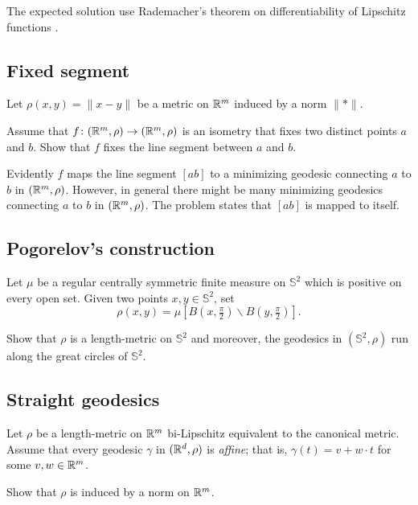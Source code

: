 The expected solution use Rademacher's theorem on differentiability of Lipschitz functions \cite[see][]{rademacher}. 



\subsection*{Fixed segment}
\label{Fixed segment}

\begin{pr}
Let $\rho(x,y)=\|x-y\|$ be a metric on $\mathbb{R}^m$ induced by a norm $\|{*}\|$.

Assume that $f\colon(\mathbb{R}^m,\rho)\to(\mathbb{R}^m,\rho)$ is an isometry that fixes two distinct points $a$ and $b$.
Show that $f$ fixes the line segment between $a$ and $b$.
\end{pr}

Evidently $f$ maps the line segment $[ab]$ to a minimizing geodesic connecting $a$ to $b$ in $(\mathbb{R}^m,\rho)$.
However, in general there might be many minimizing geodesics connecting $a$ to $b$ in $(\mathbb{R}^m,\rho)$.
The problem states that $[ab]$ is mapped to itself.


\subsection*{Pogorelov's construction\easy}
\label{Pogorelov's construction}

\begin{pr}
Let $\mu$ be a regular centrally symmetric finite measure on $\mathbb{S}^2$ which is positive on every open set.
Given two points $x,y\in \mathbb{S}^2$,
set 
\[\rho(x,y)=\mu[B(x,\tfrac \pi2)\backslash B(y,\tfrac\pi2)].\]

Show that $\rho$ is a length-metric on $\mathbb{S}^2$
and moreover, the geodesics in $(\mathbb{S}^2,\rho)$ run along the great circles of $\mathbb{S}^2$.
\end{pr}

\subsection*{Straight geodesics}
\label{Straight geodesics}

\begin{pr}
Let $\rho$ be a length-metric on $\mathbb{R}^m$ bi-Lipschitz equivalent to the canonical metric.
Assume that every geodesic $\gamma$ in $(\mathbb{R}^d,\rho)$ is \emph{affine};
that is, $\gamma(t)=v+w\cdot t$ for some $v,w\in\mathbb{R}^m$.

Show that $\rho$ is induced by a norm on $\mathbb{R}^m$.
\end{pr}

